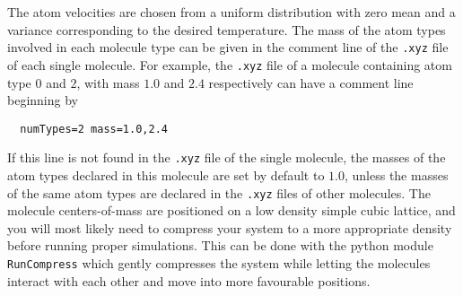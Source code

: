 \documentclass[a4paper]{article}
\begin{document}
\begin{description}
\begin{description}
  \end{description}
  The atom velocities are chosen from a uniform distribution with zero mean and a variance
  corresponding to the desired temperature.
  The mass of the atom types involved in each molecule type
  can be given in the comment line of the \texttt{.xyz} file of each single molecule. For example,
  the \texttt{.xyz} file of
  a molecule containing atom type $0$ and $2$, with mass $1.0$ and $2.4$ respectively can have a
  comment line beginning by
  \begin{verbatim} 
  numTypes=2 mass=1.0,2.4
  \end{verbatim}
  If this line is not found in the \texttt{.xyz} file of the single molecule, the masses of the atom types
  declared in this molecule are set by default to $1.0$, unless the masses of the same atom types
  are declared in the \texttt{.xyz} files of other molecules.
  The molecule centers-of-mass are positioned on a low density simple cubic
  lattice, and you will most likely need to compress your system to a more appropriate density before running proper simulations. This can be done with the python module \verb|RunCompress| which gently compresses the system while letting the molecules interact with each other and move into more favourable positions.
\end{description}

\end{document}
